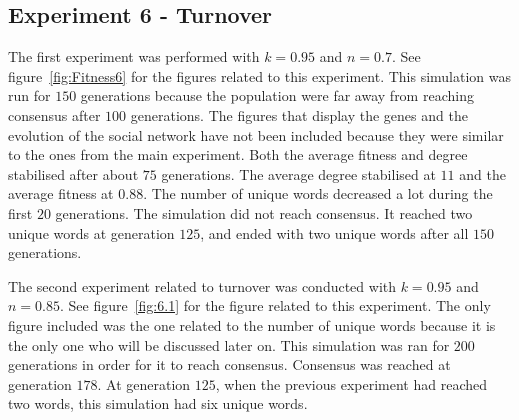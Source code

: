 \clearpage
\subsection{Experiment 6 - Turnover}
The first experiment was performed with $k = 0.95$ and $n = 0.7$. See figure~\ref{fig:Fitness6} for the figures related to this experiment. This simulation was run for $150$ generations because the population were far away from reaching consensus after $100$ generations. The figures that display the genes and the evolution of the social network have not been included because they were similar to the ones from the main experiment. Both the average fitness and degree stabilised after about $75$ generations. The average degree stabilised at $11$ and the average fitness at $0.88$. The number of unique words decreased a lot during the first $20$ generations. The simulation did not reach consensus. It reached two unique words at generation $125$, and ended with two unique words after all $150$ generations.   

The second experiment related to turnover was conducted with $k = 0.95$ and $n = 0.85$. See figure~\ref{fig:6.1} for the figure related to this experiment. The only figure included was the one related to the number of unique words because it is the only one who will be discussed later on. This simulation was ran for $200$ generations in order for it to reach consensus. Consensus was reached at generation $178$. At generation $125$, when the previous experiment had reached two words, this simulation had six unique words. 


